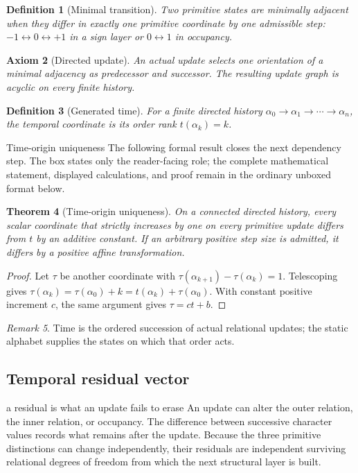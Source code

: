 \documentclass[11pt]{article}
\numberwithin{equation}{section}
\newtheorem{definition}{Definition}[section]
\newtheorem{axiom}[definition]{Axiom}
\newtheorem{theorem}[definition]{Theorem}
\theoremstyle{remark}
\newtheorem{remark}[definition]{Remark}
\begin{document}
\begin{definition}[Minimal transition]
Two primitive states are minimally adjacent when they differ in exactly one primitive coordinate by one admissible step: $-1\leftrightarrow0\leftrightarrow+1$ in a sign layer or $0\leftrightarrow1$ in occupancy.
\end{definition}

\begin{axiom}[Directed update]
An actual update selects one orientation of a minimal adjacency as predecessor and successor. The resulting update graph is acyclic on every finite history.
\end{axiom}

\begin{definition}[Generated time]
For a finite directed history
\(
\alpha_0\to\alpha_1\to\cdots\to\alpha_n
\),
the temporal coordinate is its order rank $t(\alpha_k)=k$.
\end{definition}

\begin{proofguide}{Time-origin uniqueness}
The following formal result closes the next dependency step. The box states only the reader-facing role; the complete mathematical statement, displayed calculations, and proof remain in the ordinary unboxed format below.
\end{proofguide}
\begin{theorem}[Time-origin uniqueness]
On a connected directed history, every scalar coordinate that strictly increases by one on every primitive update differs from $t$ by an additive constant. If an arbitrary positive step size is admitted, it differs by a positive affine transformation.
\end{theorem}
\begin{proof}
Let $\tau$ be another coordinate with $\tau(\alpha_{k+1})-\tau(\alpha_k)=1$. Telescoping gives $\tau(\alpha_k)=\tau(\alpha_0)+k=t(\alpha_k)+\tau(\alpha_0)$. With constant positive increment $c$, the same argument gives $\tau=ct+b$.
\end{proof}

\begin{remark}
Time is the ordered succession of actual relational updates; the static alphabet supplies the states on which that order acts.
\end{remark}

\subsection{Temporal residual vector}
\begin{interpretivebridge}{a residual is what an update fails to erase}
An update can alter the outer relation, the inner relation, or occupancy. The difference between successive character values records what remains after the update. Because the three primitive distinctions can change independently, their residuals are independent surviving relational degrees of freedom from which the next structural layer is built.
\end{interpretivebridge}
\end{document}

